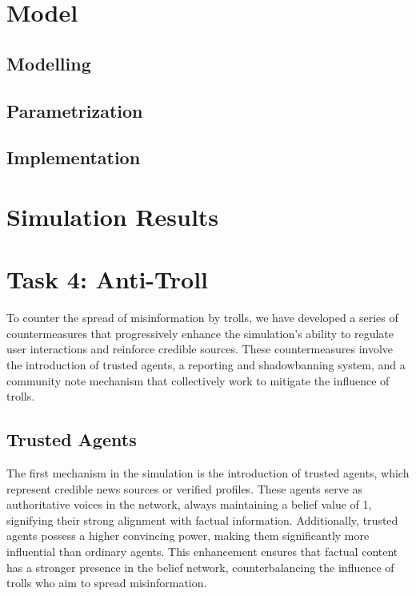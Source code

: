 \documentclass[a4paper,11pt]{scrartcl}
\begin{document}
\section{Model}
\subsection{Modelling}
\label{sec:modelling}

\subsection{Parametrization}

\subsection{Implementation}

\section{Simulation Results}

\newpage
\section{Task 4: Anti-Troll}
To counter the spread of misinformation by trolls, we have developed a series of countermeasures that progressively enhance the simulation's ability to regulate user interactions and reinforce credible sources. These countermeasures involve the introduction of trusted agents, a reporting and shadowbanning system, and a community note mechanism that collectively work to mitigate the influence of trolls.
\subsection{Trusted Agents}
The first mechanism in the simulation is the introduction of trusted agents, which represent credible news sources or verified profiles. These agents serve as authoritative voices in the network, always maintaining a belief value of 1, signifying their strong alignment with factual information. Additionally, trusted agents possess a higher convincing power, making them significantly more influential than ordinary agents. This enhancement ensures that factual content has a stronger presence in the belief network, counterbalancing the influence of trolls who aim to spread misinformation.
\end{document}

